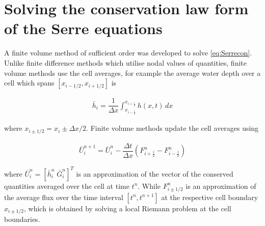 \documentclass[SingleSpace,12pt,Proceedings]{Serre_ASCE}
\begin{document}
\section{Solving the conservation law form of the Serre equations}
A finite volume method of sufficient order was developed to solve \eqref{eq:Serrecon}. Unlike finite difference methods which utilise nodal values of quantities, finite volume methods use the cell averages, for example the average water depth over a cell which spans $\left[x_{i - 1/2} , x_{i + 1/2}\right]$ is 
\begin{linenomath*}
\begin{gather*}
\bar{h}_i = \dfrac{1}{\Delta x} \int_{x_{i-\frac{1}{2}}}^{x_{i+\frac{1}{2}}} h(x,t) \, dx 
\end{gather*}
\end{linenomath*}
where $x_{i \pm 1/2} = x_i \pm \Delta x/2$. Finite volume methods update the cell averages using
\begin{linenomath*}
\begin{gather}\label{eq:FVMupdate}
\bar{U}^{n+1}_i = \bar{U}^{n}_i - \dfrac{\Delta t}{\Delta x} \left(F^n_{i+ \frac{1}{2}} - F^n_{i - \frac{1}{2}} \right)
\end{gather}
\end{linenomath*}
where $\bar{U}^{n}_i = \left[ \bar{h}^{n}_i \; \bar{G}^{n}_i \right] ^T$ is an approximation of the vector of the conserved quantities averaged over the cell at time $t^n$. While $F^n_{i\pm 1/2}$ is an approximation of the average flux over the time interval $[t^n, t^{n+1}]$ at the respective cell boundary $x_{i \pm 1/2 }$, which is obtained by solving a local Riemann problem at the cell boundaries.
\end{document}

